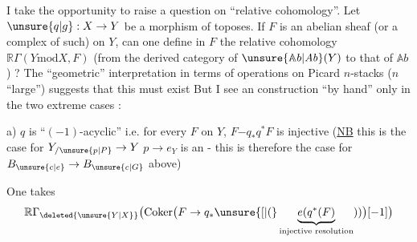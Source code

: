 
I take the opportunity to raise a question on ``relative cohomology''. Let $\unsure{q|g}:X\to Y$ be a morphism of toposes. If $F$ is an abelian sheaf (or a complex of such) on $Y$, can one define  in $F$ the relative cohomology $\mathbb R\Gamma(Y\mathbin{\mathrm{mod}}X,F)$ (from the derived category of $\unsure{\mathbb{A}b|\mathit{Ab}}(Y)$ to that of $\mathbb{A}b$) ? The ``geometric'' interpretation in terms of operations on Picard $n$-stacks ($n$ ``large'') suggests that this must exist
But I see an  construction ``by hand'' only in the two extreme cases :

a) $q$ is ``$(-1)$-acyclic'' i.e. for every $F$ on $Y$, $F\mathord{-}q_{*}q^{*}F$ is injective (\uline{NB} this is the case for $Y_{/\unsure{p|P}}\to Y$  $p\to e_{Y}$ is an  - this is therefore the case for $B_{\unsure{c|e}}\to B_{\unsure{c|G}}$ above)

One takes
\[
\mathbb R\Gamma_{\deleted{\unsure{Y|X}}}\bigl(\operatorname{Coker}\bigl(F\to q_{*}\unsure{[|(}\underbrace{e(q^{*}(F)}_{\text{injective resolution}}))\bigr)[-1]\bigr)
\]
